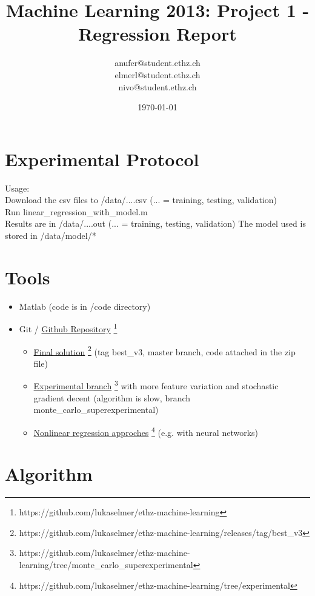 \documentclass[a4paper, 11pt]{article}
\title{Machine Learning 2013: Project 1 - Regression Report}
\author{anufer@student.ethz.ch\\ elmerl@student.ethz.ch\\ nivo@student.ethz.ch\\}
\date{\today}
\begin{document}
\maketitle

\section*{Experimental Protocol}
Usage:\\
Download the csv files to /data/....csv (... = training, testing, validation)\\
Run linear\_regression\_with\_model.m \\
Results are in /data/....out (... = training, testing, validation)
The model used is stored in /data/model/*

\section{Tools}

\begin{itemize}
\item Matlab (code is in /code directory)
\item Git / \href{https://github.com/lukaselmer/ethz-machine-learning}{Github Repository} \footnote{https://github.com/lukaselmer/ethz-machine-learning}
  \begin{itemize}
    \item \href{https://github.com/lukaselmer/ethz-machine-learning/releases/tag/best\_v3}{Final solution} \footnote{https://github.com/lukaselmer/ethz-machine-learning/releases/tag/best\_v3} (tag best\_v3, master branch, code attached in the zip file) 
    \item \href{https://github.com/lukaselmer/ethz-machine-learning/tree/monte\_carlo\_superexperimental}{Experimental branch} \footnote{https://github.com/lukaselmer/ethz-machine-learning/tree/monte\_carlo\_superexperimental} with more feature variation and stochastic gradient decent (algorithm is slow, branch monte\_carlo\_superexperimental)
    \item \href{https://github.com/lukaselmer/ethz-machine-learning/tree/experimental}{Nonlinear regression approches} \footnote{https://github.com/lukaselmer/ethz-machine-learning/tree/experimental} (e.g. with neural networks)
  \end{itemize}
\end{itemize}

\section{Algorithm}
\label{sec:Algorithm}
\end{document}
